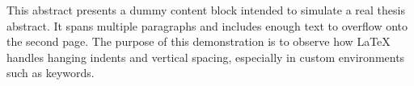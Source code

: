 This abstract presents a dummy content block intended to simulate a real thesis abstract. It spans multiple paragraphs and includes enough text to overflow onto the second page. The purpose of this demonstration is to observe how {\LaTeX} handles hanging indents and vertical spacing, especially in custom environments such as keywords.


